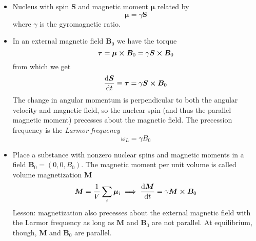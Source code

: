 \documentclass[11pt, a4paper]{article}
\renewcommand{\vec}[1]{\bm{#1}}
\newcommand{\m}{\vec{\mu}}  %
\renewcommand{\S}{\vec{S}}  %
\newcommand{\B}{\vec{B}}  %
\newcommand{\M}{\vec{M}}  %
\begin{document}
\begin{itemize}
	\item Nucleus with spin $ \vec{S} $ and magnetic moment $ \vec{\mu} $ related by
	\begin{equation*}
		\m = \gamma \S
	\end{equation*}
	where $ \gamma $ is the gyromagnetic ratio.
	
	\item In an external magnetic field $ \B_{0} $ we have  the torque
	\begin{equation*}
		\vec{\tau} = \m \cross \B_{0} = \gamma \S \cross \B_{0}
	\end{equation*}
	from which we get
	\begin{equation*}
		\dv{\S}{t} \equiv \vec{\tau} = \gamma \S \cross \B_{0}
	\end{equation*}	
	The change in angular momentum is perpendicular to both the angular velocity and magnetic field, so the nuclear spin (and thus the parallel magnetic moment) precesses about the magnetic field. The precession frequency is the \textit{Larmor frequency}
	\begin{equation*}
		\omega_{L} = \gamma B_{0}
	\end{equation*}
	
	\item Place a substance with nonzero nuclear spins and magnetic moments in a field $ \B_{0} = (0, 0, B_{0}) $. The magnetic moment per unit volume is called volume magnetization $ \vec{M} $
	\begin{equation*}
		\M = \frac{1}{V}\sum_{i}\m_{i}  \implies \dv{\M}{t} = \gamma \M \cross \B_{0}
	\end{equation*}
	Lesson: magnetization also precesses about the external magnetic field with the Larmor frequency as long as $ \M $ and $ \B_{0} $ are not parallel. At equilibrium, though, $ \M $ and $ \B_{0} $ are parallel.
	
\end{itemize}
\end{document}
